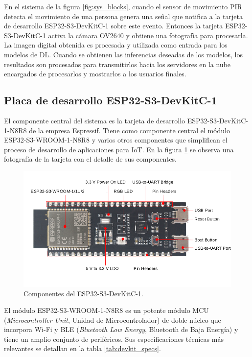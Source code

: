 En el sistema de la figura \ref{fig:sys_blocks}, cuando el sensor de movimiento PIR detecta el movimiento de una persona genera una señal que notifica a la tarjeta de desarrollo ESP32-S3-DevKitC-1 sobre este evento. Entonces la tarjeta ESP32-S3-DevKitC-1 activa la cámara OV2640 y obtiene una fotografía para procesarla. La imagen digital obtenida es procesada y utilizada como entrada para los modelos de DL. Cuando se obtienen las inferencias deseadas de los modelos, los resultados son procesados para transmitirlos hacia los servidores en la nube encargados de procesarlos y mostrarlos a los usuarios finales.

\subsection{Placa de desarrollo ESP32-S3-DevKitC-1}
El componente central del sistema es la tarjeta de desarrollo ESP32-S3-DevKitC-1-N8R8 de la empresa Espressif. Tiene como componente central el módulo ESP32-S3-WROOM-1-N8R8 y varios otros componentes que simplifican el proceso de desarrollo de aplicaciones para IoT. En la figura \ref{fig:devkit_comp} se observa una fotografía de la tarjeta con el detalle de sus componentes.

\begin{figure}[h]
	\centering
	\includegraphics[scale=0.4]{./Figures/devkit_comp.png}
	\caption{Componentes del ESP32-S3-DevKitC-1\protect\footnotemark.}
	\label{fig:devkit_comp}
\end{figure}

El módulo ESP32-S3-WROOM-1-N8R8 es un potente módulo MCU (\textit{Microcontroller Unit}, Unidad de Microcontrolador) de doble núcleo que incorpora Wi-Fi y BLE (\textit{Bluetooth Low Energy}, Bluetooth de Baja Energía) y tiene un amplio conjunto de periféricos. Sus especificaciones técnicas más relevantes se detallan en la tabla \ref{tab:devkit_specs}.

